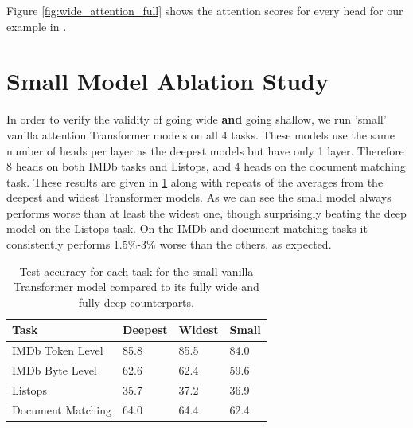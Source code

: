 Figure \ref{fig:wide_attention_full} shows the attention scores for every head for our example in .


\section{Small Model Ablation Study}\label{appendix:ablation}

In order to verify the validity of going wide \textbf{and} going shallow, we run 'small' vanilla attention Transformer models on all 4 tasks.
These models use the same number of heads per layer as the deepest models but have only 1 layer.
Therefore 8 heads on both IMDb tasks and Listops, and 4 heads on the document matching task.
These results are given in \cref{table:smol} along with repeats of the averages from the deepest and widest Transformer models.
As we can see the small model always performs worse than at least the widest one, though surprisingly beating the deep model on the Listops task.
On the IMDb and document matching tasks it consistently performs 1.5\%-3\% worse than the others, as expected.

\begin{table}[!h]
    \caption{Test accuracy for each task for the small vanilla Transformer model compared to its fully wide and fully deep counterparts.}
    \label{table:smol}
    \begin{center}
        \begin{tabular}{l | l l l}
            \toprule
            {\bf Task} & \textbf{Deepest} & \textbf{Widest} & \textbf{Small} \\
            \midrule
            IMDb Token Level & 85.8 & 85.5 & 84.0 \\
            IMDb Byte Level & 62.6 & 62.4 & 59.6 \\
            Listops & 35.7 & 37.2 & 36.9 \\
            Document Matching & 64.0 & 64.4 & 62.4 \\
            \bottomrule
        \end{tabular}
    \end{center}
\end{table}

